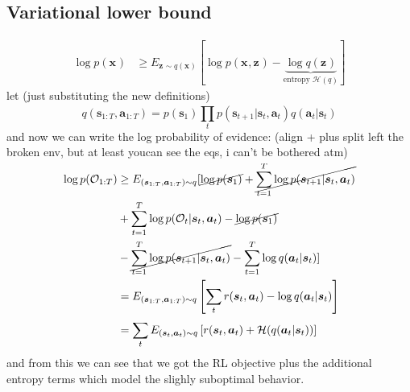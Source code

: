 \documentclass{report}
\begin{document}
\subsection{Variational lower bound}
\begin{align}
		\log p (\bm{x}_{}) &\geq E_{ \bm{z}_{} \sim q (\bm{x}_{}) } \left[  \log p (\bm{x}_{}, \bm{z}_{}) - 
\underbrace{\log q (\bm{z}_{})}_{ \text{entropy } \mathcal{H}(q) } \right] 
\end{align}
let (just substituting the new definitions)
\begin{equation}
q (\bm{s}_{1:T}, \bm{a}_{1:T} ) = p (\bm{s}_{1}) \prod_{t}^{} p (\bm{s}_{t+1}|\bm{s}_{t}, \bm{a}_{t}) q(\bm{a}_{t}| \bm{s}_{t} )
\end{equation}
and now we can write the log probability of evidence:
(align + plus split left the broken env, 
but at least youcan see the eqs, i can't be bothered atm)
\begin{align}
		\log p (\mathcal{O}_{ 1:T }) &\geq 
		E_{ (\bm{s}_{1:T}, \bm{a}_{1:T} ) \sim q }
		[ 
				\cancel{\log p (\bm{s}_{1})} + \cancel{ \sum_{t=1}^{T} \log p (\bm{s}_{t+1}|\bm{s}_{t}, \bm{a}_{t})} \nonumber \\
									 &+ 
		\sum_{t=1}^{T} \log p (\mathcal{O}_{ t }| \bm{s}_{t}, \bm{a}_{t}) - 
		\cancel{\log p (\bm{s}_{1})} \nonumber \\ &- 
\cancel{\sum_{t=1}^{T} \log p (\bm{s}_{t+1}|\bm{s}_{t}, \bm{a}_{t}) }
- \sum_{t=1}^{T} \log q (\bm{a}_{t}| \bm{s}_{t} )
] \nonumber \\
&= E_{  (\bm{s}_{1:T}, \bm{a}_{1:T} ) \sim q  } \left[ \sum_{t}^{} r(\bm{s}_{t}, \bm{a}_{t} ) - \log q(\bm{a}_{t}| \bm{s}_{t} ) \right] \\
&= \sum_{t}^{} E_{ (\bm{s}_{t}, \bm{a}_{t} ) \sim q } \left[ r(\bm{s}_{t}, \bm{a}_{t} ) + \mathcal{H} (q (\bm{a}_{t}| \bm{s}_{t} )) \right] 
\end{align}
and from this we can see that we got the RL objective plus the additional entropy terms
which model the slighly suboptimal behavior.
\end{document}
